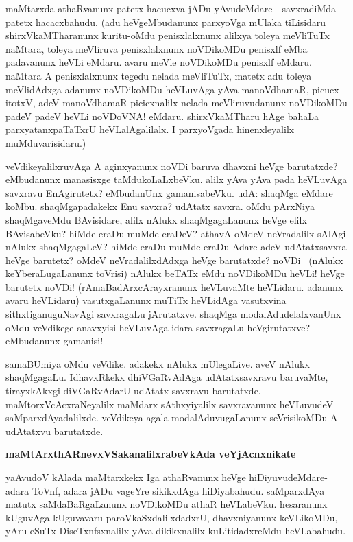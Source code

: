 \noindent
maMtarxda athaRvanunx patetx hacucxva jADu yAvudeMdare - savxradiMda patetx hacacxbahudu. (adu heVgeMbudanunx parxyoVga mUlaka tiLisidaru shirxVkaMTharanunx kuritu-oMdu penisxlalxnunx alilxya toleya meVliTuTx\- naMtara, toleya meVliruva penisxlalxnunx noVDikoMDu penisxlf eMba padavanunx heVLi eMda\-ru. avaru meVle noVDikoMDu penisxlf eMdaru. naMtara A penisxlalxnunx tegedu nelada meVliTuTx, matetx adu toleya meVlidAdxga adanunx noVDikoMDu heVLuvAga yAva manoVdhamaR, picucx itotxV, adeV manoV\-dhamaR-picicxnalilx nelada meVliruvudanunx noVDikoMDu padeV padeV heVLi noVDoVNA! eMdaru. shirxVkaMTharu hAge bahaLa parxyatanxpaTaTxrU heVLalAgalilalx. I parxyoVgada hinenxleyalilx muMdu\-varisidaru.)

veVdikeyalilxruvAga A aginxyanunx noVDi baruva dhavxni heVge barutatxde? 
eMbudanunx manasisxge taMdu\-koLaLx\-beVku. alilx yAva yAva pada heVLuvAga 
savxravu EnAgirutetx? eMbudanUnx gamanisa\-beVku. udA: shaqMga eMdare 
koMbu. shaqMgapadakekx Enu savxra? udAtatx savxra. oMdu pArxNiya 
shaqMga\-veMdu BAvisi\-dare, alilx nAlukx shaqMgagaLanunx heVge elilx 
BAvisabeVku? hiMde eraDu muMde eraDeV? athavA oMdeV neVradalilx sAlAgi nAlukx shaqMgagaLeV? hiMde eraDu muMde eraDu Adare adeV udAtatx\-savxra heVge barutetx? 
oMdeV neVradalilxdAdxga heVge barutatxde? noVDi~ (nAlukx keYberaLugaLanunx toVrisi) nAlukx beTATx\- eMdu noVDikoMDu heVLi! heVge barutetx noVDi! (rAmaBadArxcArayxranunx heVLuvaMte heVLi\-daru. adanunx avaru heVLidaru) vasutxgaLanunx muTiTx heVLidAga vasutxvina sithxtiganuguNavAgi savxragaLu jAru\-tatxve. shaqMga modalAdudelalxvanUnx oMdu veVdikege anavxyisi heVLuvAga idara savxragaLu heVgiru\-tatxve? eMbudanunx gamanisi!

samaBUmiya oMdu veVdike. adakekx nAlukx mUlegaLive. aveV nAlukx 
shaqMgagaLu. IdhavxRkekx dhiVGaR\-vAdAga udAtatxsavxravu baruvaMte, 
tirayxkAkxgi diVGaRvAdarU udAtatx savxravu barutatxde. 
maMtorxV\-cAcxraNe\-yalilx maMdarx sAthxyiyalilx savxravanunx heVLuvudeV 
saMparxdAyadalilxde. veVdikeya agala moda\-lAduvu\-gaLanunx seVrisikoMDu A udAtatxvu barutatxde.

{\bigskip
\noindent
{\large\bf maMtArxthARnevxVSakanalilxrabeVkAda veYjAcnxnikate}}\label{page119}
\medskip

\noindent
yaAvudoV kAlada maMtarxkekx Iga athaRvanunx heVge hiDiyuvudeMdare-adara ToVnf, adara jADu vageYre sikikxdAga hiDiyabahudu. saMparxdAya matutx saMdaBaRgaLanunx noVDikoMDu athaR heVLa\-beVku. hesaranunx kUguvAga kUguvavaru paroVkaSxdalilxdadxrU, dhavxniyanunx keVLikoMDu, yAru eSuTx DiseTxnfsx\-nalilx yAva dikikxnalilx kuLitidadxreMdu heVLabahudu.

